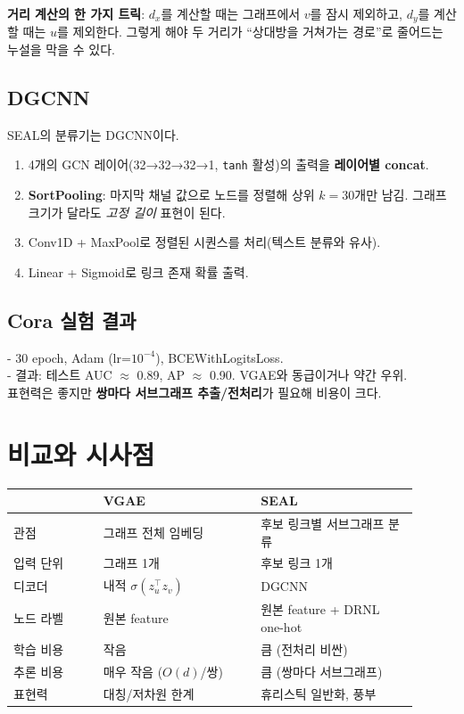 \documentclass[11pt,a4paper]{article}
\begin{document}
\textbf{거리 계산의 한 가지 트릭}: $d_x$를 계산할 때는 그래프에서 $v$를 잠시 제외하고,
$d_y$를 계산할 때는 $u$를 제외한다. 그렇게 해야 두 거리가 ``상대방을 거쳐가는 경로''로 줄어드는 누설을 막을 수 있다.

\subsection{DGCNN}
SEAL의 분류기는 DGCNN이다.
\begin{enumerate}[leftmargin=*]
  \item 4개의 GCN 레이어(32→32→32→1, \texttt{tanh} 활성)의 출력을 \textbf{레이어별 concat}.
  \item \textbf{SortPooling}: 마지막 채널 값으로 노드를 정렬해 상위 $k=30$개만 남김.
        그래프 크기가 달라도 \emph{고정 길이} 표현이 된다.
  \item Conv1D + MaxPool로 정렬된 시퀀스를 처리(텍스트 분류와 유사).
  \item Linear + Sigmoid로 링크 존재 확률 출력.
\end{enumerate}

\subsection{Cora 실험 결과}
- 30 epoch, Adam (lr=$10^{-4}$), BCEWithLogitsLoss.\\
- 결과: 테스트 AUC $\approx$ 0.89, AP $\approx$ 0.90. VGAE와 동급이거나 약간 우위.\\
표현력은 좋지만 \textbf{쌍마다 서브그래프 추출/전처리}가 필요해 비용이 크다.

\section{비교와 시사점}
\begin{center}
\begin{tabular}{p{0.20\linewidth} p{0.35\linewidth} p{0.35\linewidth}}
\toprule
 & \textbf{VGAE} & \textbf{SEAL} \\
\midrule
관점     & 그래프 전체 임베딩 & 후보 링크별 서브그래프 분류 \\
입력 단위 & 그래프 1개 & 후보 링크 1개 \\
디코더   & 내적 $\sigma(z_u^\top z_v)$ & DGCNN \\
노드 라벨 & 원본 feature & 원본 feature + DRNL one-hot \\
학습 비용 & 작음 & 큼 (전처리 비싼) \\
추론 비용 & 매우 작음 ($O(d)$/쌍) & 큼 (쌍마다 서브그래프) \\
표현력   & 대칭/저차원 한계 & 휴리스틱 일반화, 풍부 \\
\bottomrule
\end{tabular}
\end{center}
\end{document}
